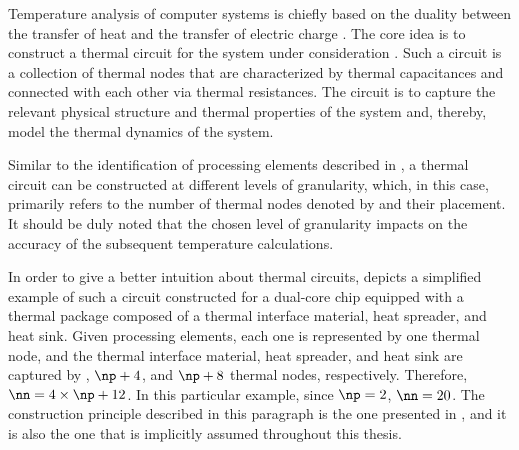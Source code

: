 Temperature analysis of computer systems is chiefly based on the duality between
the transfer of heat and the transfer of electric charge \cite{kreith2000}. The
core idea is to construct a thermal  circuit for the system under
consideration \cite{skadron2003}. Such a circuit is a collection of thermal
nodes that are characterized by thermal capacitances and connected with each
other via thermal resistances. The circuit is to capture the relevant physical
structure and thermal properties of the system and, thereby, model the thermal
dynamics of the system.

Similar to the identification of processing elements described in
, a thermal  circuit can be constructed at different
levels of granularity, which, in this case, primarily refers to the number of
thermal nodes denoted by \nn and their placement. It should be duly noted that
the chosen level of granularity impacts on the accuracy of the subsequent
temperature calculations.

In order to give a better intuition about thermal  circuits,
 depicts a simplified example of such a circuit
constructed for a dual-core chip equipped with a thermal package composed of a
thermal interface material, heat spreader, and heat sink. Given \np processing
elements, each one is represented by one thermal node, and the thermal interface
material, heat spreader, and heat sink are captured by \np, $\np + 4$, and $\np
+ 8$ thermal nodes, respectively. Therefore, $\nn = 4 \times \np + 12$. In this
particular example, since $\np = 2$, $\nn = 20$. The construction principle
described in this paragraph is the one presented in \cite{huang2008}, and it is
also the one that is implicitly assumed throughout this thesis.

